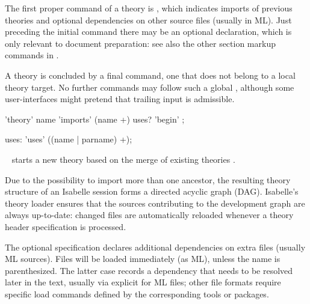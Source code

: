 \begin{isabellebody}
\begin{isamarkuptext}
  The first proper command of a theory is \hyperlink{command.theory}{\mbox{}}, which
  indicates imports of previous theories and optional dependencies on
  other source files (usually in ML).  Just preceding the initial
  \hyperlink{command.theory}{\mbox{}} command there may be an optional \hyperlink{command.header}{\mbox{}} declaration, which is only relevant to document
  preparation: see also the other section markup commands in
  .

  A theory is concluded by a final \hyperlink{command.global.end}{\mbox{}} command,
  one that does not belong to a local theory target.  No further
  commands may follow such a global \hyperlink{command.global.end}{\mbox{}},
  although some user-interfaces might pretend that trailing input is
  admissible.

  \begin{rail}
    'theory' name 'imports' (name +) uses? 'begin'
    ;

    uses: 'uses' ((name | parname) +);
  \end{rail}

  \begin{description}

  \item \hyperlink{command.theory}{\mbox{}}~
  starts a new theory  based on the merge of existing
  theories .
  
  Due to the possibility to import more than one ancestor, the
  resulting theory structure of an Isabelle session forms a directed
  acyclic graph (DAG).  Isabelle's theory loader ensures that the
  sources contributing to the development graph are always up-to-date:
  changed files are automatically reloaded whenever a theory header
  specification is processed.
  
  The optional \hypertarget{keyword.uses}{\hyperlink{keyword.uses}{\mbox{}}} specification declares additional
  dependencies on extra files (usually ML sources).  Files will be
  loaded immediately (as ML), unless the name is parenthesized.  The
  latter case records a dependency that needs to be resolved later in
  the text, usually via explicit \hyperlink{command.use}{\mbox{}} for ML files;
  other file formats require specific load commands defined by the
  corresponding tools or packages.
  

\end{description}
\end{isamarkuptext}
\end{isabellebody}
